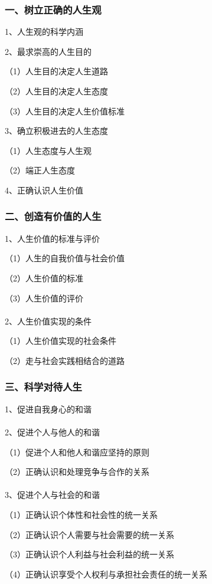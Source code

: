 \documentclass{ctexart}
\begin{document}
\subsubsection{一、树立正确的人生观}

1、人生观的科学内涵

2、最求崇高的人生目的

（1）人生目的决定人生道路

（2）人生目的决定人生态度

（3）人生目的决定人生价值标准

3、确立积极进去的人生态度

（1）人生态度与人生观

（2）端正人生态度

4、正确认识人生价值

\subsubsection{二、创造有价值的人生}

1、人生价值的标准与评价

（1）人生的自我价值与社会价值

（2）人生价值的标准

（3）人生价值的评价
\\\\

2、人生价值实现的条件

（1）人生价值实现的社会条件

（2）走与社会实践相结合的道路

\subsubsection{三、科学对待人生}
1、促进自我身心的和谐
\\\\

2、促进个人与他人的和谐

（1）促进个人和他人和谐应坚持的原则

（2）正确认识和处理竞争与合作的关系
\\\\

3、促进个人与社会的和谐

（1）正确认识个体性和社会性的统一关系

（2）正确认识个人需要与社会需要的统一关系

（3）正确认识个人利益与社会利益的统一关系

（4）正确认识享受个人权利与承担社会责任的统一关系
\\\\
\end{document}
